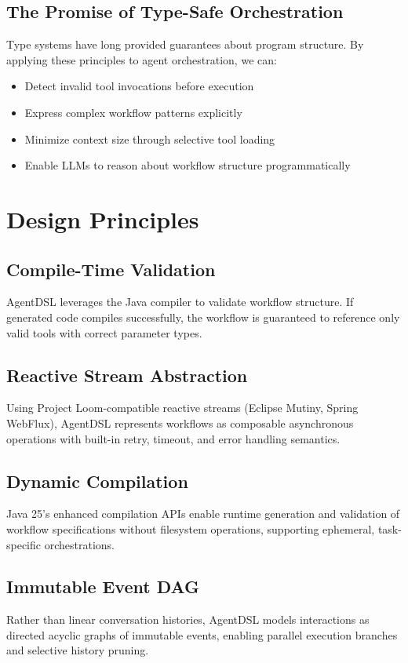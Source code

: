 \documentclass[11pt,a4paper]{article}
\begin{document}
\subsection{The Promise of Type-Safe Orchestration}

Type systems have long provided guarantees about program structure. By applying these principles to agent orchestration, we can:
\begin{itemize}
    \item Detect invalid tool invocations before execution
    \item Express complex workflow patterns explicitly
    \item Minimize context size through selective tool loading
    \item Enable LLMs to reason about workflow structure programmatically
\end{itemize}

\section{Design Principles}

\subsection{Compile-Time Validation}
AgentDSL leverages the Java compiler to validate workflow structure. If generated code compiles successfully, the workflow is guaranteed to reference only valid tools with correct parameter types.

\subsection{Reactive Stream Abstraction}
Using Project Loom-compatible reactive streams (Eclipse Mutiny, Spring WebFlux), AgentDSL represents workflows as composable asynchronous operations with built-in retry, timeout, and error handling semantics.

\subsection{Dynamic Compilation}
Java 25's enhanced compilation APIs enable runtime generation and validation of workflow specifications without filesystem operations, supporting ephemeral, task-specific orchestrations.

\subsection{Immutable Event DAG}
Rather than linear conversation histories, AgentDSL models interactions as directed acyclic graphs of immutable events, enabling parallel execution branches and selective history pruning.
\end{document}
